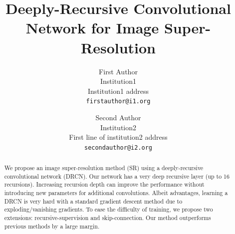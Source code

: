 \documentclass[10pt,twocolumn,letterpaper]{article}
\begin{document}


\title{Deeply-Recursive Convolutional Network for Image Super-Resolution}

\author{First Author\\
	Institution1\\
	Institution1 address\\
	{\tt\small firstauthor@i1.org}
	\and
	Second Author\\
	Institution2\\
	First line of institution2 address\\
	{\tt\small secondauthor@i2.org}
}

\maketitle



\begin{abstract}
We propose an image super-resolution method (SR) using a deeply-recursive convolutional network (DRCN). Our network has a very deep recursive layer (up to 16 recursions). Increasing recursion depth can improve the performance without introducing new parameters for additional convolutions. Albeit advantages, learning a DRCN is very hard with a standard gradient descent method due to exploding/vanishing gradients. To ease the difficulty of training, we propose two extensions: recursive-supervision and skip-connection. Our method outperforms previous methods by a large margin.
\end{abstract}
\end{document}
